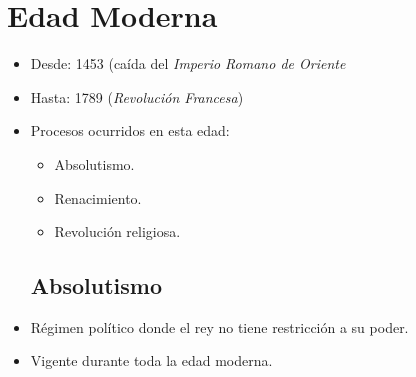 \section{Edad Moderna}

\begin{itemize}

\item Desde: 1453 (caída del \emph{Imperio Romano de Oriente}
\item Hasta: 1789 (\emph{Revolución Francesa})

\item Procesos ocurridos en esta edad:
\begin{itemize}
	\item Absolutismo.
	\item Renacimiento.
	\item Revolución religiosa.
\end{itemize}

\subsection{Absolutismo}

\item Régimen político donde el rey no tiene restricción a su poder.
\item Vigente durante toda la edad moderna.

\newpage

\newpage

\newpage


\end{itemize}